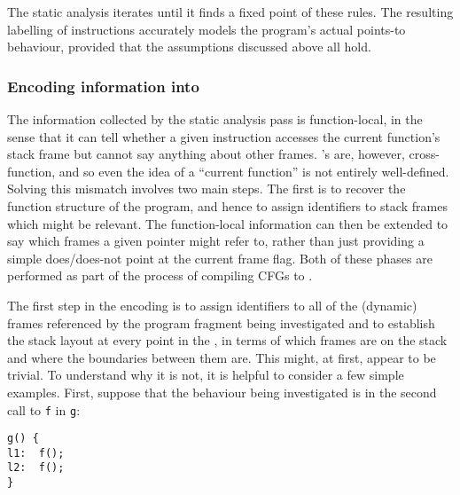The static analysis iterates until it finds a fixed point of these
rules.  The resulting labelling of instructions accurately models the
program's actual points-to behaviour, provided that the assumptions
discussed above all hold.


\subsubsection{Encoding information into \StateMachines}

The information collected by the static analysis pass is
function-local, in the sense that it can tell whether a given
instruction accesses the current function's stack frame but cannot say
anything about other frames.  {\Technique}'s {\StateMachines} are,
however, cross-function, and so even the idea of a ``current
function'' is not entirely well-defined.  Solving this mismatch
involves two main steps.  The first is to recover the function
structure of the program, and hence to assign identifiers to stack
frames which might be relevant.  The function-local information can
then be extended to say which frames a given pointer might refer to,
rather than just providing a simple does/does-not point at the current
frame flag.  Both of these phases are performed as part of the process
of compiling CFGs to {\StateMachines}.


The first step in the encoding is to assign identifiers to all of the
(dynamic) frames referenced by the program fragment being investigated
and to establish the stack layout at every point in the
{\StateMachine}, in terms of which frames are on the stack and where
the boundaries between them are.  This might, at first, appear to be
trivial.  To understand why it is not, it is helpful to consider a few
simple examples.  First, suppose that the behaviour being investigated
is in the second call to \verb|f| in \verb|g|:

\begin{verbatim}
g() {
l1:  f();
l2:  f();
}
\end{verbatim}

